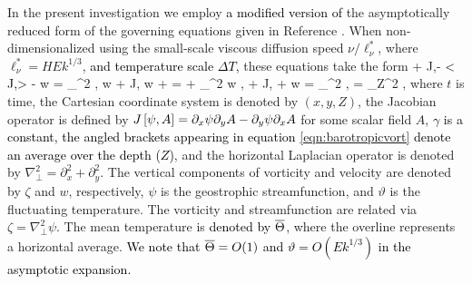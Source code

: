 
In the present investigation we employ \textcolor{black}{a modified version of} the asymptotically reduced form of the governing equations given in Reference \citep{mS06}. When non-dimensionalized using the small-scale viscous diffusion speed $\nu/\ell^*_\nu$, where $\ell^*_\nu = H Ek^{1/3}$, \textcolor{black}{and temperature scale $\Delta T$,} these equations take the form
	\be
\dst \zeta + J\ls \psi,\zeta \rs - \textcolor{black}{\gamma \left< J\ls \psi,\zeta \rs \right>} - \dz w = \nabla_\perp^2 \zeta,
		\label{eqn:barotropicvort}
	\ee
	\be
		\dst w + J\ls \psi , w \rs + \dz \psi = \vartheta + \nabla_\perp^2 w ,
		\label{eqn:barotropicmom}
	\ee
	\be
		\dst \vartheta + J\ls \psi , \vartheta \rs + w \dz \mth =  \nabla_\perp^2 \vartheta,
		\label{eqn:barotropictemp}
	\ee
	\be
		\dz \lb {} \rb =  \partial_Z^2 \mth,
		\label{eqn:barotropicdff}
	\ee
	where $t$ is time, the Cartesian coordinate system is denoted by $(x,y,Z)$, the Jacobian operator is defined by $J\ls \psi ,A\rs = \dsx \psi \dsy A -\dsy \psi \dsx A$ for some scalar field $A$, \textcolor{black}{$\gamma$ is a constant, the angled brackets appearing in equation \eqref{eqn:barotropicvort} denote an average over the depth ($Z$)}, and the horizontal Laplacian operator is denoted by $\nabla_\perp^2 = \partial_x^2 + \partial_y^2$. The vertical components of vorticity and velocity are denoted by $\zeta$ and $w$, respectively, $\psi$ is the geostrophic streamfunction, and $\vartheta$ is the fluctuating temperature.  The vorticity and streamfunction are related via $\zeta = \nabla_\perp^2 \psi$. The mean temperature is \textcolor{black}{denoted by} $\overline{\Theta}$, where the overline represents a horizontal average. \textcolor{black}{We note that $\overline{\Theta} = O(1)$ and $\vartheta=O(Ek^{1/3})$ in the asymptotic expansion. }

